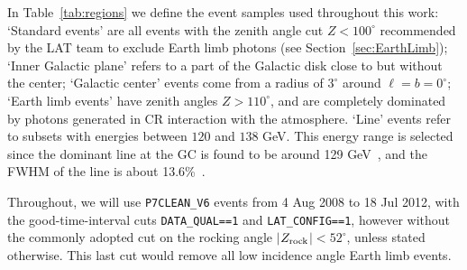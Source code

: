 \documentclass[aps,twocolumn,prd,superscriptaddress,showpacs,nofootinbib,fixfloat]{revtex4}
\newcommand{\zrock}{$Z_{\rm rock}$}
\begin{document}
In Table~\ref{tab:regions} we define the event samples
used throughout this work: `Standard events' are all
events with the zenith angle cut $Z<100^\circ$ recommended
by the LAT team to exclude Earth
limb photons (see Section~\ref{sec:EarthLimb}); `Inner
Galactic plane' refers to a part of the Galactic disk close
to but without the center; `Galactic center' events come from
a radius of $3^\circ$ around
$\ell=b=0^\circ$; `Earth limb events' have
zenith angles $Z>110^\circ$, and are completely
dominated by photons generated in CR interaction with the
atmosphere. `Line' events refer to subsets with energies
between $120$ and $138$ GeV. This energy range is selected
since the dominant line at the GC is found to be around 129
GeV~\cite{linepaper}, and the FWHM of the line is about
13.6\%~\cite{Weniger:2012}.

Throughout, we will use \texttt{P7CLEAN\_V6} events from 4
Aug 2008 to 18 Jul 2012, with the good-time-interval cuts
\texttt{DATA\_QUAL==1} and \texttt{LAT\_CONFIG==1}, however
without the commonly adopted cut on the rocking angle
$|$\zrock$|<52^\circ$, unless stated otherwise. This last cut would remove
all low incidence angle Earth limb events.
\medskip


\medskip
\end{document}
